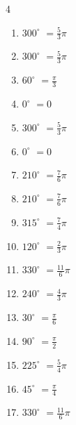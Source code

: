 \begin{multicols}{4}
\begin{enumerate}
  \item $\displaystyle 300^{\circ}$
        $\displaystyle =\frac{5}{3}\pi$

  \item $\displaystyle 300^{\circ}$
        $\displaystyle =\frac{5}{3}\pi$

  \item $\displaystyle 60^{\circ}$
        $\displaystyle =\frac{\pi}{3}$

  \item $\displaystyle 0^{\circ}$
        $\displaystyle =0$

  \item $\displaystyle 300^{\circ}$
        $\displaystyle =\frac{5}{3}\pi$

  \item $\displaystyle 0^{\circ}$
        $\displaystyle =0$

  \item $\displaystyle 210^{\circ}$
        $\displaystyle =\frac{7}{6}\pi$

  \item $\displaystyle 210^{\circ}$
        $\displaystyle =\frac{7}{6}\pi$

  \item $\displaystyle 315^{\circ}$
        $\displaystyle =\frac{7}{4}\pi$

  \item $\displaystyle 120^{\circ}$
        $\displaystyle =\frac{2}{3}\pi$

  \item $\displaystyle 330^{\circ}$
        $\displaystyle =\frac{11}{6}\pi$

  \item $\displaystyle 240^{\circ}$
        $\displaystyle =\frac{4}{3}\pi$

  \item $\displaystyle 30^{\circ}$
        $\displaystyle =\frac{\pi}{6}$

  \item $\displaystyle 90^{\circ}$
        $\displaystyle =\frac{\pi}{2}$

  \item $\displaystyle 225^{\circ}$
        $\displaystyle =\frac{5}{4}\pi$

  \item $\displaystyle 45^{\circ}$
        $\displaystyle =\frac{\pi}{4}$

  \item $\displaystyle 330^{\circ}$
        $\displaystyle =\frac{11}{6}\pi$


\end{enumerate}
\end{multicols}
